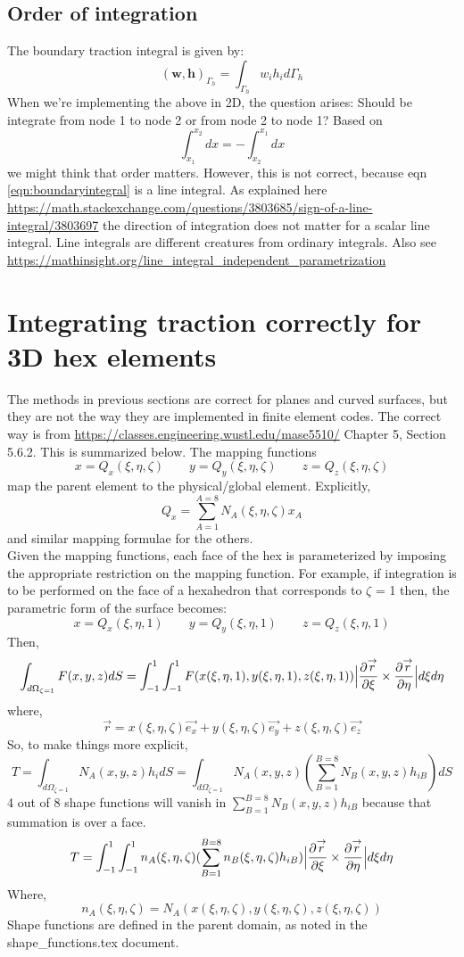 \documentclass{article}
\newcommand{\beq}{\begin{equation}}
\newcommand{\eeq}{\end{equation}}
\newcommand{\pdd}[2]{\frac{\partial{#1}}{\partial{#2}}}
\begin{document}
\subsection{Order of integration}
The boundary traction integral is given by:
\beq
\label{eqn:boundaryintegral}
(\mathbf{w},\mathbf{h})_{\Gamma_h} = \int_{\Gamma_h}w_ih_i d\Gamma_h
\eeq
When we're implementing the above in 2D, the question arises: Should be integrate from node 1 to node 2 or from node 2 to node 1?
Based on
\beq
\int_{x_1}^{x_2} dx = -\int_{x_2}^{x_1} dx
\eeq
we might think that order matters. However, this is not correct, because eqn \ref{eqn:boundaryintegral} is a line integral. As explained here \url{https://math.stackexchange.com/questions/3803685/sign-of-a-line-integral/3803697} the direction of integration does not matter for a scalar line integral. Line integrals are different creatures from ordinary integrals. Also see \url{https://mathinsight.org/line_integral_independent_parametrization}
\section{\label{sect:3dhexcorrect}Integrating traction correctly for 3D hex elements}
The methods in previous sections are correct for planes and curved surfaces, but they are not the way they are implemented in finite element codes. The correct way is from \url{https://classes.engineering.wustl.edu/mase5510/} Chapter 5, Section 5.6.2. This is summarized below. The mapping functions
\beq
x = Q_x(\xi,\eta,\zeta) \qquad  y = Q_y(\xi,\eta,\zeta) \qquad   z = Q_z(\xi,\eta,\zeta) 
\eeq
map the parent element to the physical/global element. Explicitly,
\beq
Q_x = \sum_{A=1}^{A=8}N_A(\xi,\eta,\zeta)x_A
\eeq
and similar mapping formulae for the others.\\
Given the mapping functions, each face of the hex is parameterized by imposing the appropriate restriction on the mapping function. For example, if integration is to be performed on the face of a hexahedron that corresponds to $\zeta$ = 1 then, the parametric form of the surface becomes:
\beq
x = Q_x(\xi,\eta,1) \qquad  y = Q_y(\xi,\eta,1) \qquad   z = Q_z(\xi,\eta,1) 
\eeq
Then,
\beq
\int_{{d\Omega}_{\zeta=1}} F(x,y,z)dS = \int_{-1}^{1}\int_{-1}^{1}F(x(\xi,\eta,1),y(\xi,\eta,1),z(\xi,\eta,1))\Big{|}\pdd{\stackrel{\rightarrow}{r}}{\xi}\times\pdd{\stackrel{\rightarrow}{r}}{\eta}\Big{|}{d\xi}d\eta
\eeq
where,
\beq
\stackrel{\rightarrow}{r} = x(\xi,\eta,\zeta)\stackrel{\rightarrow}{e_x} + y(\xi,\eta,\zeta)\stackrel{\rightarrow}{e_y} + z(\xi,\eta,\zeta)\stackrel{\rightarrow}{e_z}
\eeq
So, to make things more explicit,
\beq
T=\int_{{d\Omega}_{\zeta=1}} N_A(x,y,z)h_i dS = \int_{{d\Omega}_{\zeta=1}} N_A(x,y,z)(\sum_{B=1}^{B=8}N_{B}(x,y,z)h_{iB} )dS
\eeq
4 out of 8 shape functions will vanish in $\sum_{B=1}^{B=8}N_{B}(x,y,z)h_{iB}$ because that summation is over a face.
\beq
T =  \int_{-1}^{1}\int_{-1}^{1}  n_A(\xi,\eta,\zeta) (\sum_{B=1}^{B=8}n_{B}(\xi,\eta,\zeta)h_{iB})       \Big{|}\pdd{\stackrel{\rightarrow}{r}}{\xi}\times\pdd{\stackrel{\rightarrow}{r}}{\eta}\Big{|}{d\xi}d\eta
\eeq
Where,
\beq
n_A(\xi,\eta,\zeta) = N_A(x(\xi,\eta,\zeta),y(\xi,\eta,\zeta),z(\xi,\eta,\zeta))
\eeq
Shape functions are defined in the parent domain, as noted in the shape\_functions.tex document.
\end{document}
